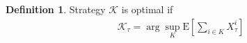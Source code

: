 \documentclass[12pt]{article}
\newcommand{\E}{\text{E}}
\theoremstyle{my_thm}
\theoremstyle{definition}
\theoremstyle{my_def}
\newtheorem{defn}[thm]{Definition}
\numberwithin{SubExCount1}{ExCount1}
\begin{document}
\begin{defn}
Strategy $\mathcal{K}$ is optimal if
\begin{align*}
\mathcal{K}_\tau=\arg \sup_{K} \E \left[ \sum_{i\in K} X_\tau^i \right]
\end{align*}
\end{defn}


\newpage


\end{document}
